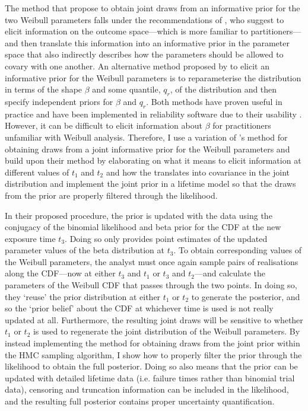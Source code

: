 The method that \citeauthor{kaminskiy2005} propose to obtain joint draws from an informative prior for the two Weibull parameters falls under the recommendations of \citet{gelman_workflow_2020}, who suggest to elicit information on the outcome space---which is more familiar to partitioners---and then translate this information into an informative prior in the parameter space that also indirectly describes how the parameters should be allowed to covary with one another. An alternative method proposed by \citet{Meeker2022} to elicit an informative prior for the Weibull parameters is to reparameterise the distribution in terms of the shape $\beta$ and some quantile, $q_r$, of the distribution and then specify independent priors for $\beta$ and $q_r$. Both methods have proven useful in practice and have been implemented in reliability software due to their usability \citep{krivtsov2017}. However, it can be difficult to elicit information about $\beta$ for practitioners unfamiliar with Weibull analysis. Therefore, I use a variation of \citeauthor{kaminskiy2005}'s method for obtaining draws from a joint informative prior for the Weibull parameters and build upon their method by elaborating on what it means to elicit information at different values of $t_1$ and $t_2$ and how the translates into covariance in the joint distribution and implement the joint prior in a lifetime model so that the draws from the prior are properly filtered through the likelihood.

In their proposed procedure, the prior is updated with the data using the conjugacy of the binomial likelihood and beta prior for the CDF at the new exposure time $t_3$. Doing so only provides point estimates of the updated parameter values of the beta distribution at $t_3$. To obtain corresponding values of the Weibull parameters, the analyst must once again sample pairs of realisations along the CDF---now at either $t_3$ and $t_1$ or $t_3$ and $t_2$---and calculate the parameters of the Weibull CDF that passes through the two points. In doing so, they `reuse' the prior distribution at either $t_1$ or $t_2$ to generate the posterior, and so the `prior belief' about the CDF at whichever time is used is not really updated at all. Furthermore, the resulting joint draws will be sensitive to whether $t_1$ or $t_2$ is used to regenerate the joint distribution of the Weibull parameters. By instead implementing the method for obtaining draws from the joint prior within the HMC sampling algorithm, I show how to properly filter the prior through the likelihood to obtain the full posterior. Doing so also means that the prior can be updated with detailed lifetime data (i.e. failure times rather than binomial trial data), censoring and truncation information can be included in the likelihood, and the resulting full posterior contains proper uncertainty quantification. 

